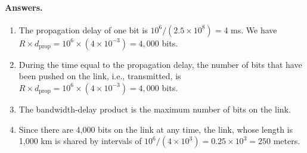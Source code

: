 
\paragraph{Answers.}
\begin{enumerate}

  \item The propagation delay of one bit is \(10^6/(2.5 \times 10^8) =
    4\) ms. We have \(R \times d_{\text{prop}} = 10^6 \times (4 \times
    10^{-3}) = 4,000\) bits.

  \item During the time equal to the propagation delay, the number of
    bits that have been pushed on the link, i.e., transmitted, is \(R
    \times d_{\text{prop}} = 10^6 \times (4 \times 10^{-3}) = 4,000\)
    bits.

  \item The bandwidth-delay product is the maximum number of bits on
    the link.

  \item Since there are 4,000 bits on the link at any time, the link,
    whose length is 1,000 km is shared by intervals of \(10^6/(4
    \times 10^3) = 0.25 \times 10^3 = 250\) meters.

\end{enumerate}
